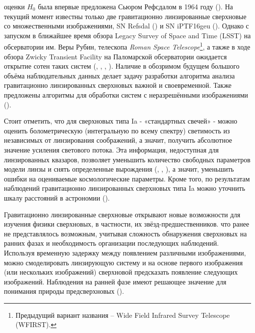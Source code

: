 оценки $H_0$ была впервые предложена Сьюром Рефсдалом в 1964 году (\cite{refsdal1964}). На текущий момент известны только две гравитационно линзированные сверхновые со множественными изображениями, SN Refsdal (\cite{kelly2014}) и SN iPTF16geu (\cite{goobar2017}). Однако с запуском в ближайшее время обзора Legacy Survey of Space and Time (LSST) на обсерватории им. Веры Рубин, телескопа \textit{Roman Space Telescope}\footnote{Предыдущий вариант названия -- Wide Field Infrared Survey Telescope (WFIRST).}, а также в ходе обзора Zwicky Transient Facility на Паломарской обсерватории ожидается открытие сотен таких систем (\cite{ogurimarshall}, \cite{goldsteinnugent2017}, \cite{veracrubin}, \cite{rst}). Наличие в обозримом будущем большого объёма наблюдательных данных делает задачу разработки алгоритма анализа гравитационно линзированных сверхновых важной и своевременной. Также предложены алгоритмы для обработки систем с неразрешёнными изображениями (\cite{beitunresolved}). 

Стоит отметить, что для сверхновых типа Ia - «стандартных свечей» - можно оценить болометрическую (интегральную по всему спектру) светимость из независимых от линзирования соображений, а значит, получить абсолютное значение усиления светового потока. Эта информация, недоступная для линзированных квазаров, позволяет уменьшить количество свободных параметров модели линзы и снять определенные вырождения (\cite{falco1985}, \cite{holz2001}, \cite{ogurikawano2003}), а значит, уменьшить ошибки на  оцениваемые космологические параметры. Кроме того, по результатам наблюдений гравитационно линзированных сверхновых типа Ia можно уточнить шкалу расстояний в астрономии (\cite{ddr}).

Гравитационно линзированные сверхновые открывают новые возможности для изучения физики сверхновых, в частности, их звёзд-предшественников.  %
что ранее не представлялось возможным, учитывая сложность обнаружения сверхновых на ранних фазах и необходимость организации последующих наблюдений. Используя временную задержку между появлением различными изображениями, можно смоделировать линзирующую систему и на основе первого изображения (или нескольких изображений) сверхновой предсказать  появление следующих изображений. Наблюдения на ранней фазе имеют решающее значение для понимания природы предсверхновых (\cite{holismokesI}).